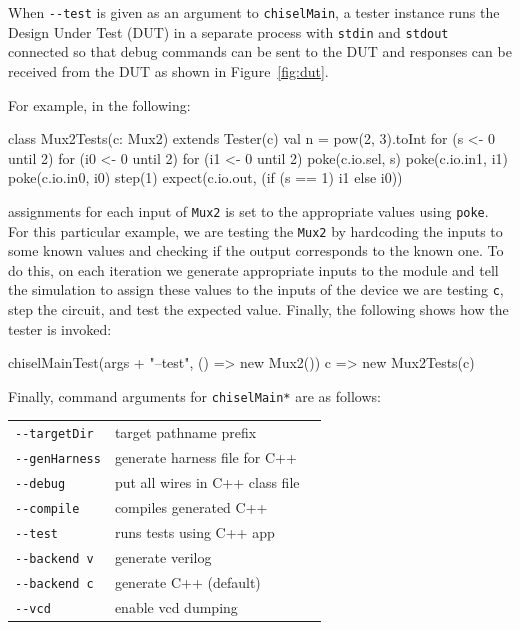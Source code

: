\documentclass[10pt,twocolumn]{article}
\def\code#1{{\small\tt #1}}
\begin{document}
\noindent
When \code{-{-}test} is given as an argument to \code{chiselMain}, a
tester instance runs the Design Under Test (DUT) in a separate
process with \code{stdin} and \code{stdout} connected so that debug commands can 
be sent to the DUT and responses can be received from the DUT as shown in
Figure~\ref{fig:dut}.
\noindent

For example, in the following:

\begin{scala}
class Mux2Tests(c: Mux2) extends Tester(c) {
  val n = pow(2, 3).toInt
  for (s <- 0 until 2) {
    for (i0 <- 0 until 2) {
      for (i1 <- 0 until 2) {
        poke(c.io.sel, s)
        poke(c.io.in1, i1)
        poke(c.io.in0, i0)
        step(1)
        expect(c.io.out, (if (s == 1) i1 else i0))
      }
    }
  }
}
\end{scala}

\noindent
assignments for each input of \verb+Mux2+ is set to the appropriate values using \verb+poke+. For this particular example, we are testing the \verb+Mux2+ by hardcoding the inputs to some known values and checking if the output corresponds to the known one. To do this, on each iteration we generate appropriate inputs to the module and tell the simulation to assign these values to the inputs of the device we are testing \verb+c+, step the circuit, and test the expected value.  
Finally, the following shows how the tester is invoked:

\begin{scala}
chiselMainTest(args + "--test", () => new Mux2()){ 
  c => new Mux2Tests(c) 
}
\end{scala}

Finally, command arguments for \code{chiselMain*} are as follows: \\

\begin{tabular}{lll}
\verb+--targetDir+ & target pathname prefix \\
\verb+--genHarness+ & generate harness file for C++ \\
\verb+--debug+ & put all wires in C++ class file \\
\verb+--compile+ & compiles generated C++ \\
\verb+--test+ & runs tests using C++ app \\
\verb+--backend v+ & generate verilog \\ 
\verb+--backend c+ & generate C++ (default)\\
\verb+--vcd+ & enable vcd dumping \\
\end{tabular}
\end{document}
